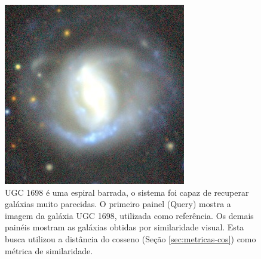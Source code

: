 \begin{figure}[!ht]
  \includegraphics[width=0.195\linewidth]{figures/stamps/q4_29}
  \caption{UGC 1698 é uma espiral barrada, o sistema foi capaz de recuperar galáxias muito parecidas. O primeiro painel (Query) mostra a imagem da galáxia UGC 1698, utilizada como referência. Os demais painéis mostram as galáxias obtidas por similaridade visual. Esta busca utilizou a distância do cosseno (Seção \ref{sec:metricas-cos}) como métrica de similaridade.}
  \label{fig:q4}
\end{figure}






